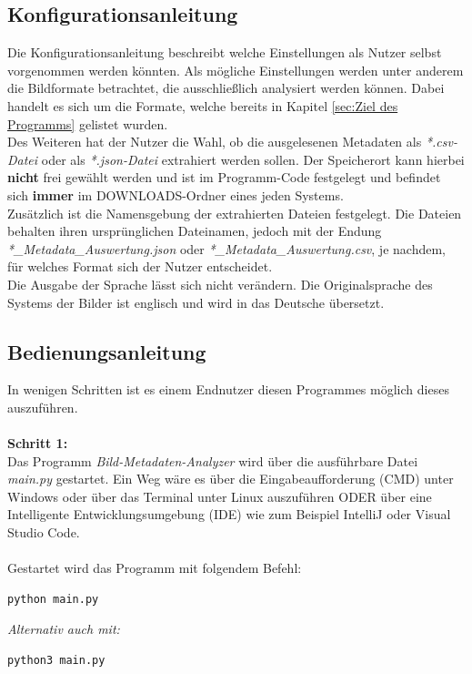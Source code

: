 \documentclass{Bild-Metadaten-Analyzer}
\begin{document}
\subsection{Konfigurationsanleitung}\label{subsec:Konfigurationsanleitung}
Die Konfigurationsanleitung beschreibt welche Einstellungen als Nutzer selbst vorgenommen werden könnten. Als mögliche Einstellungen 
werden unter anderem die Bildformate betrachtet, die ausschließlich analysiert werden können. Dabei handelt es sich um die Formate, 
welche bereits in Kapitel \ref{sec:Ziel des Programms}  gelistet wurden.\\

Des Weiteren hat der Nutzer die Wahl, ob die ausgelesenen Metadaten als \textit{*.csv-Datei} oder als \textit{*.json-Datei} 
extrahiert werden sollen. Der Speicherort kann hierbei \textbf{nicht} frei gewählt werden und ist im Programm-Code festgelegt und 
befindet sich \textbf{immer} im DOWNLOADS-Ordner eines jeden Systems.\\

Zusätzlich ist die Namensgebung der extrahierten Dateien festgelegt. Die Dateien behalten ihren ursprünglichen Dateinamen, jedoch 
mit der Endung \textit{*\_Metadata\_Auswertung.json} oder \textit{*\_Metadata\_Auswertung.csv}, je nachdem, für welches Format sich der 
Nutzer entscheidet.\\

Die Ausgabe der Sprache lässt sich nicht verändern. Die Originalsprache des Systems der Bilder ist englisch und wird in das Deutsche 
übersetzt.

\subsection{Bedienungsanleitung}\label{subsec:Bedienungsanleitung}
In wenigen Schritten ist es einem Endnutzer diesen Programmes möglich dieses auszuführen.\\
\\\textbf{Schritt 1:}
\\Das Programm \textit{Bild-Metadaten-Analyzer} wird über die ausführbare Datei \textit{main.py} gestartet. Ein Weg wäre es  
über die Eingabeaufforderung (CMD) unter Windows oder über das Terminal unter Linux auszuführen ODER über eine Intelligente 
Entwicklungsumgebung (IDE) wie zum Beispiel IntelliJ oder Visual Studio Code.\\
\\Gestartet wird das Programm mit folgendem Befehl:
\begin{lstlisting}[style=pythonstyle]
python main.py
\end{lstlisting}
\textit{Alternativ auch mit:}
\begin{lstlisting}[style=pythonstyle]
python3 main.py
\end{lstlisting}
\end{document}
